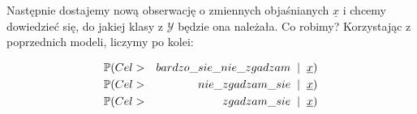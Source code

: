 \documentclass[11pt,usenames,dvipsnames,svgnames,x11names]{beamer}
\theoremstyle{plain}
\theoremstyle{definition}
\theoremstyle{remark}
\begin{document}
\begin{frame}
Następnie dostajemy nową obserwację o zmiennych objaśnianych $\underline{x}$ i chcemy dowiedzieć się, do jakiej klasy z $\mathcal{Y}$ będzie ona należała. Co robimy? Korzystając z poprzednich modeli, liczymy po kolei:

\begin{eqnarray*}
\mathbb{P}(Cel &>& bardzo\_sie\_nie\_zgadzam\hspace{2mm}|\hspace{2mm}\underline{x})\\
\mathbb{P}(Cel &>& nie\_zgadzam\_sie\hspace{2mm}|\hspace{2mm}\underline{x})\\
\mathbb{P}(Cel &>& zgadzam\_sie\hspace{2mm}|\hspace{2mm}\underline{x})
\end{eqnarray*}

\end{frame}
\end{document}
